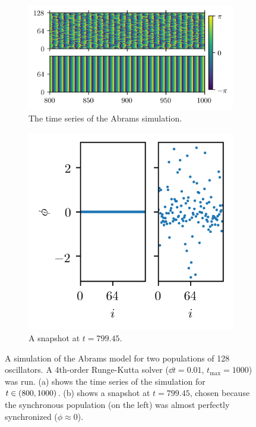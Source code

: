 \begin{figure}[ht]
  \centering
  \begin{subfigure}{0.6\textwidth}
    \centering
    \includegraphics[width=\textwidth]{figure/abrams_overhead}
    \caption{The time series of the Abrams simulation.}
    \label{fig:abrams_overhead}
  \end{subfigure} %
  \begin{subfigure}{0.3\textwidth}
    \centering
    \includegraphics[width=\textwidth]{figure/abrams_snapshot}
    \caption{A snapshot at $t = 799.45$.}
    \label{fig:abrams_snapshot}
  \end{subfigure}
  \caption[Abrams simulation]{A simulation of the Abrams model for two populations of 128 oscillators.
    A 4th-order Runge-Kutta solver ($\dd{t} = 0.01$, $t_{\text{max}} = 1000$) was run.
    (a) shows the time series of the simulation for $t \in \pqty{800, 1000}$.
    (b) shows a snapshot at $t = 799.45$, chosen because the synchronous population (on the left) was almost perfectly synchronized ($\phi \approx 0$).
  }
  \label{fig:abrams}
\end{figure}

